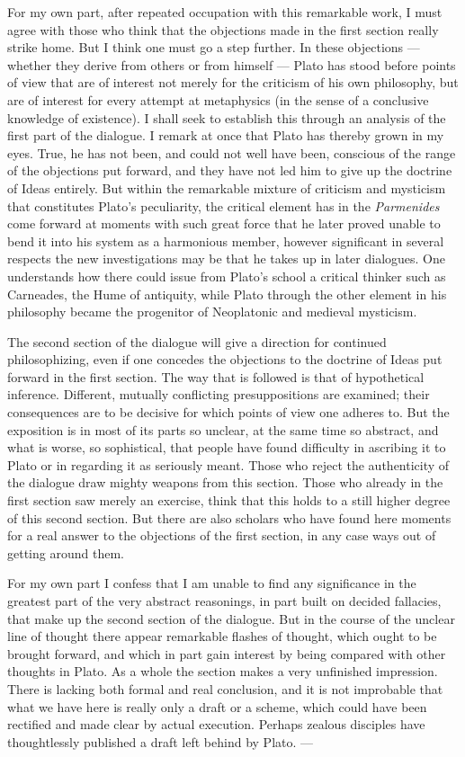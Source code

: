 \documentclass[12pt,a4paper,openany]{book}
\newcommand{\opage}[1]{\marginnote{\footnotesize\textit{[#1]}}}
\begin{document}
For my own part, after repeated occupation
with this remarkable work, I must agree with those who
think that the objections %
made in the first section really
strike home. But I think one must go a step further.
In these objections --- whether they derive
from others or from himself --- Plato has stood before points of view
that are of interest not merely for the criticism of his own philosophy,
but are of interest for every attempt at metaphysics
(in the sense of a conclusive knowledge of existence). I
shall seek to establish this through an analysis of the first
part of the dialogue. I remark at once that Plato has thereby grown
in my eyes. True, he has not been, and could not well
have been, conscious of the range of the objections put forward,
and they have not led him to give up the doctrine of Ideas entirely.
But within the remarkable mixture of criticism and mysticism
that constitutes Plato’s peculiarity, the critical element has in the \textit{Parmenides}
come forward at moments with such
great force that he later proved unable to bend it
into his system as a harmonious member, however significant
in several respects the new investigations may be that he
takes up in later dialogues. One understands how there could
issue from Plato’s school a critical thinker such as
Carneades, the Hume of antiquity, while Plato through the
other element in his philosophy became the progenitor of Neoplatonic
and medieval mysticism.

The second section of the dialogue will give a direction for continued
philosophizing, even if one concedes the objections to the doctrine of Ideas
put forward in the first section. The way that
is followed is that of hypothetical inference.
\setcounter{footnote}{0}%
\opage{5}Different, mutually conflicting presuppositions are examined; their consequences
are to be decisive for which points of view one
adheres to. But the exposition is in most of its parts so
unclear, at the same time so abstract, and what is worse, so sophistical,
that people have found difficulty in ascribing it to Plato
or in regarding it as seriously meant. Those who reject
the authenticity of the dialogue draw mighty weapons from this
section. Those who already in the first section saw merely an exercise,
think that this holds to a still higher degree of
this second section. But there are also scholars who
have found here moments for a real answer to the objections of the
first section, in any case ways out
of getting around them.

For my own part I confess that I am unable
to find any significance in the greatest part of
the very abstract reasonings, in part built on decided fallacies,
that make up the second section of the dialogue.
But in the course of the unclear line of thought there appear remarkable
flashes of thought, which ought to be brought forward, and which in part
gain interest by being compared with other thoughts
in Plato. As a whole the section makes a very unfinished
impression. There is lacking both formal and real conclusion, and
it is not improbable that what we have here is really only
a draft or a scheme, which could have been rectified and made clear
by actual execution. Perhaps zealous disciples
have thoughtlessly published a draft left behind by Plato. ---
\end{document}
